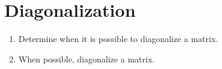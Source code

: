\section{Diagonalization}

\begin{outcome}
  \begin{enumerate}
  \item Determine when it is possible to diagonalize a matrix.
  \item When possible, diagonalize a matrix.
  \end{enumerate}
\end{outcome}
